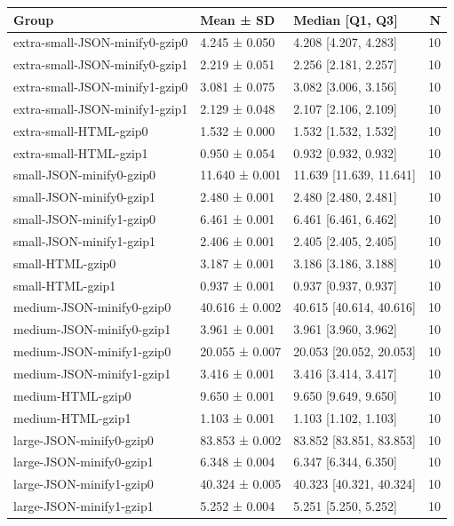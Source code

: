 \begin{tabular}{lllr}
\toprule
Group & Mean ± SD & Median [Q1, Q3] & N \\
\midrule
extra-small-JSON-minify0-gzip0 & 4.245 ± 0.050 & 4.208 [4.207, 4.283] & 10 \\
extra-small-JSON-minify0-gzip1 & 2.219 ± 0.051 & 2.256 [2.181, 2.257] & 10 \\
extra-small-JSON-minify1-gzip0 & 3.081 ± 0.075 & 3.082 [3.006, 3.156] & 10 \\
extra-small-JSON-minify1-gzip1 & 2.129 ± 0.048 & 2.107 [2.106, 2.109] & 10 \\
extra-small-HTML-gzip0 & 1.532 ± 0.000 & 1.532 [1.532, 1.532] & 10 \\
extra-small-HTML-gzip1 & 0.950 ± 0.054 & 0.932 [0.932, 0.932] & 10 \\
small-JSON-minify0-gzip0 & 11.640 ± 0.001 & 11.639 [11.639, 11.641] & 10 \\
small-JSON-minify0-gzip1 & 2.480 ± 0.001 & 2.480 [2.480, 2.481] & 10 \\
small-JSON-minify1-gzip0 & 6.461 ± 0.001 & 6.461 [6.461, 6.462] & 10 \\
small-JSON-minify1-gzip1 & 2.406 ± 0.001 & 2.405 [2.405, 2.405] & 10 \\
small-HTML-gzip0 & 3.187 ± 0.001 & 3.186 [3.186, 3.188] & 10 \\
small-HTML-gzip1 & 0.937 ± 0.001 & 0.937 [0.937, 0.937] & 10 \\
medium-JSON-minify0-gzip0 & 40.616 ± 0.002 & 40.615 [40.614, 40.616] & 10 \\
medium-JSON-minify0-gzip1 & 3.961 ± 0.001 & 3.961 [3.960, 3.962] & 10 \\
medium-JSON-minify1-gzip0 & 20.055 ± 0.007 & 20.053 [20.052, 20.053] & 10 \\
medium-JSON-minify1-gzip1 & 3.416 ± 0.001 & 3.416 [3.414, 3.417] & 10 \\
medium-HTML-gzip0 & 9.650 ± 0.001 & 9.650 [9.649, 9.650] & 10 \\
medium-HTML-gzip1 & 1.103 ± 0.001 & 1.103 [1.102, 1.103] & 10 \\
large-JSON-minify0-gzip0 & 83.853 ± 0.002 & 83.852 [83.851, 83.853] & 10 \\
large-JSON-minify0-gzip1 & 6.348 ± 0.004 & 6.347 [6.344, 6.350] & 10 \\
large-JSON-minify1-gzip0 & 40.324 ± 0.005 & 40.323 [40.321, 40.324] & 10 \\
large-JSON-minify1-gzip1 & 5.252 ± 0.004 & 5.251 [5.250, 5.252] & 10 \\

\end{tabular}
